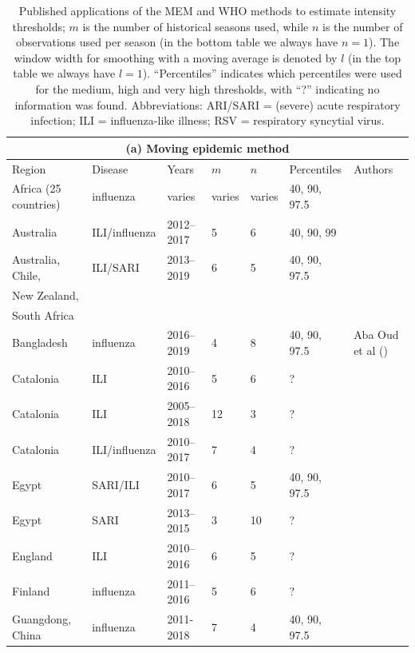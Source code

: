 \documentclass{article}
\begin{document}
\begin{table}[h!]
\caption{\footnotesize Published applications of the MEM and WHO methods to estimate intensity thresholds; $m$ is the number of historical seasons used, while $n$ is the number of observations used per season (in the bottom table we always have $n = 1$). The window width for smoothing with a moving average is denoted by $l$ (in the top table we always have $l = 1$). ``Percentiles'' indicates which percentiles were used for the medium, high and very high thresholds, with ``?'' indicating no information was found. Abbreviations: ARI/SARI = (severe) acute respiratory infection; ILI = influenza-like illness; RSV = respiratory syncytial virus.}
\label{tab:literature}
\center
\footnotesize
\begin{tabular}{l l l l l l l}
\toprule
\multicolumn{7}{c}{(a) Moving epidemic method}\\
\toprule
Region & Disease & Years & $m$ & $n$ & Percentiles & Authors\\
\midrule
Africa (25 countries) & influenza & varies & varies & varies & 40, 90, 97.5 & \cite{Igboh2021} \\
Australia & ILI/influenza & 2012--2017 & 5 & 6 & 40, 90, 99 & \cite{Vette2018}\\
Australia, Chile, & ILI/SARI & 2013--2019 & 6 & 5 & 40, 90, 97.5 & \cite{Sullivan2019}\\
New Zealand,\\
South Africa\\
Bangladesh & influenza & 2016--2019 & 4 & 8 & 40, 90, 97.5 & Aba Oud et al (\citeyear{AbaOud2021})\\
Catalonia & ILI & 2010--2016 & 5 & 6 & ? & \cite{Basile2018}\\
Catalonia & ILI & 2005--2018 & 12 & 3 & ? & \cite{Basile2019}\\
Catalonia & ILI/influenza & 2010--2017 & 7 & 4 & ? & \cite{Torner2019}\\
Egypt & SARI/ILI & 2010--2017 & 6 & 5 & 40, 90, 97.5 & \cite{AbdElGawad2020}\\
Egypt & SARI & 2013--2015 & 3 & 10 & ? & \cite{Elhakim2019}\\
England & ILI & 2010--2016 & 6 & 5 & ? & \cite{Wagner2018}\\
Finland & influenza & 2011--2016 & 5 & 6 & ? & \cite{Pesaelae2019}\\
Guangdong, China & influenza & 2011-2018 & 7 & 4 & 40, 90, 97.5 & \cite{Kang2021} \\

\end{tabular}
\end{table}
\end{document}

